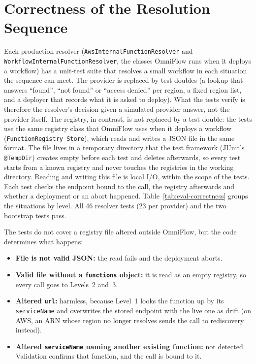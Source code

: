 \section{Correctness of the Resolution Sequence}
\label{sec:eval-correctness}

Each production resolver (\texttt{Aws\allowbreak Internal\allowbreak Function\allowbreak Resolver}
and \texttt{Workflow\allowbreak Internal\allowbreak Function\allowbreak Resolver}, the classes OmniFlow
runs when it deploys a workflow) has a unit-test suite that resolves a small workflow in each
situation the sequence can meet. The provider is replaced by test doubles (a lookup that answers ``found'', ``not found'' or ``access denied'' per
region, a fixed region list, and a deployer that records what it is asked to deploy). What the tests
verify is therefore the resolver's decision given a simulated provider answer, not the provider
itself. The registry, in contrast, is not replaced by a test double: the tests use the same registry
class that OmniFlow uses when it deploys a workflow (\texttt{Function\allowbreak Registry\allowbreak
Store}), which reads and writes a JSON file in the same format. The file lives in a temporary
directory that the test framework (JUnit's \texttt{@TempDir}) creates empty before each test and
deletes afterwards, so every test starts from a known registry and never touches the registries in
the working directory. Reading and writing this file is local I/O, within the scope of the tests. Each test checks the endpoint bound to the call, the registry afterwards and whether
a deployment or an abort happened. Table~\ref{tab:eval-correctness} groups the situations by level.
All 46 resolver tests (23 per provider) and the two bootstrap tests pass.

The tests do not cover a registry file altered outside OmniFlow, but the code determines what
happens:

\begin{itemize}
  \item \textbf{File is not valid JSON:} the read fails and the deployment aborts.
  \item \textbf{Valid file without a \texttt{functions} object:} it is read as an empty registry,
  so every call goes to Levels~2 and~3.
  \item \textbf{Altered \texttt{url}:} harmless, because Level~1 looks the function up by its
  \texttt{serviceName} and overwrites the stored endpoint with the live one as drift (on AWS, an
  ARN whose region no longer resolves sends the call to rediscovery instead).
  \item \textbf{Altered \texttt{serviceName} naming another existing function:} not detected.
  Validation confirms that function, and the call is bound to it.
\end{itemize}

